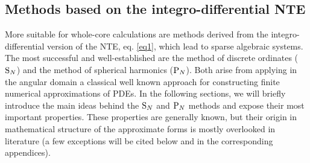 \subsection{Methods based on the integro-differential NTE}\label{sec:idNTE} 

More suitable for whole-core calculations are methods derived from the integro-differential
version of the NTE, eq.
\eqref{eq1}, which lead to sparse algebraic systems. The most successful and well-established are the method
of discrete ordinates ($\text{S}_{N}$) and the method of spherical harmonics ($\text{P}_{N}$).
Both arise from applying in the
angular domain a classical well known approach for constructing finite numerical
approximations of PDEs.  In the following
sections, we will briefly introduce the main ideas behind the $\text{S}_{N}$ and $\text{P}_{N}$ methods and expose their most
important properties. These properties are generally known, but their origin in mathematical structure of the
approximate forms is mostly overlooked in literature (a few exceptions will be cited below and in the corresponding
appendices). 


